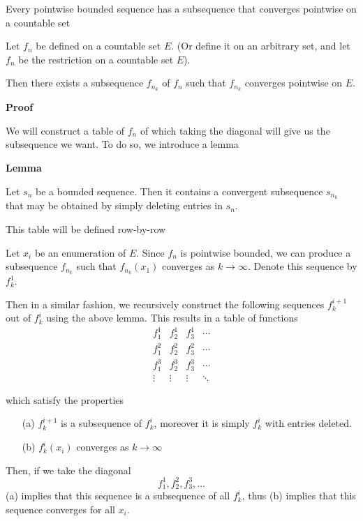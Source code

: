 \begin{theorem} Every pointwise bounded sequence has a subsequence that converges pointwise on a countable set

    Let $f_n$ be defined on a countable set $E$. (Or define it on an arbitrary set, and let $f_n$ be the restriction on a countable set $E$).

    Then there exists a subsequence $f_{n_k}$ of $f_n$ such that $f_{n_k}$ converges pointwise on $E$.

    \textbf{Proof}

    We will construct a table of $f_n$ of which taking the diagonal will give us the subsequence we want. To do so, we introduce a lemma

    \begin{lemma}
    \textbf{Lemma}

    Let $s_n$ be a bounded sequence. Then it contains a convergent subsequence $s_{n_k}$ that may be obtained by simply deleting entries in $s_n$.
    \end{lemma}

    This table will be defined row-by-row

    Let $x_i$ be an enumeration of $E$. Since $f_n$ is pointwise bounded, we can produce a subsequence $f_{n_k}$ such that $f_{n_k}(x_1)$ converges as $k \to \infty$. Denote this sequence by $f^1_k$. 

    Then in a similar fashion, we recursively construct the following sequences $f^{i+1}_k$ out of $f^i_k$ using the above lemma. This results in a table of functions
    \[\begin{matrix}
        f^1_1 & f^1_2 & f^1_3 & \cdots \\
        f^2_1 & f^2_2 & f^2_3 & \cdots \\
        f^3_1 & f^3_2 & f^3_3 & \cdots \\
        \vdots & \vdots & \vdots & \ddots
    \end{matrix}\]

    which satisfy the properties
    \begin{itemize}
        \item[(a)] $f^{i+1}_k$ is a subsequence of $f^i_k$, moreover it is simply $f^i_k$ with entries deleted. 
        \item[(b)] $f^i_k(x_i)$ converges as $k \to \infty$
    \end{itemize}

    Then, if we take the diagonal
    \[f^1_1, f^2_2,  f^3_3, \ldots\] 
    (a) implies that this sequence is a subsequence of all $f^i_k$, thus (b) implies that this sequence converges for all $x_i$.
\end{theorem}

